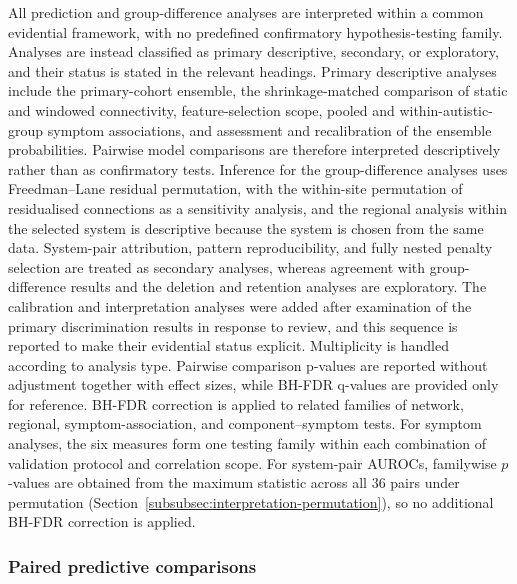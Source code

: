 All prediction and group-difference analyses are interpreted within a common evidential framework, with no predefined confirmatory hypothesis-testing family. Analyses are instead classified as primary descriptive, secondary, or exploratory, and their status is stated in the relevant headings. Primary descriptive analyses include the primary-cohort ensemble, the shrinkage-matched comparison of static and windowed connectivity, feature-selection scope, pooled and within-autistic-group symptom associations, and assessment and recalibration of the ensemble probabilities. Pairwise model comparisons are therefore interpreted descriptively rather than as confirmatory tests. Inference for the group-difference analyses uses Freedman--Lane residual permutation, with the within-site permutation of residualised connections as a sensitivity analysis, and the regional analysis within the selected system is descriptive because the system is chosen from the same data. System-pair attribution, pattern reproducibility, and fully nested penalty selection are treated as secondary analyses, whereas agreement with group-difference results and the deletion and retention analyses are exploratory. The calibration and interpretation analyses were added after examination of the primary discrimination results in response to review, and this sequence is reported to make their evidential status explicit. Multiplicity is handled according to analysis type. Pairwise comparison p-values are reported without adjustment together with effect sizes, while BH-FDR q-values are provided only for reference. BH-FDR correction is applied to related families of network, regional, symptom-association, and component--symptom tests. For symptom analyses, the six measures form one testing family within each combination of validation protocol and correlation scope. For system-pair AUROCs, familywise $p$-values are obtained from the maximum statistic across all 36 pairs under permutation (Section~\ref{subsubsec:interpretation-permutation}), so no additional BH-FDR correction is applied.

\subsubsection{Paired predictive comparisons}
\label{subsubsec:paired-comparisons}

